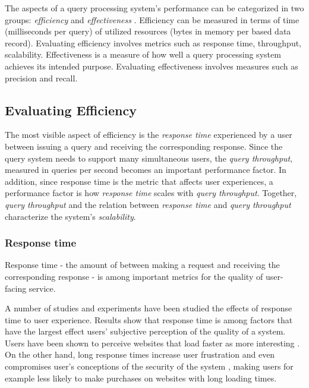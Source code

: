 The aspects of a query processing system's performance can be categorized in two groups:
\textit{efficiency} and \textit{effectiveness} \cite{buttcher:informationretrieval}.
Efficiency can be measured in terms of time (milliseconds per query) of utilized resources (bytes in memory per based
data record).
Evaluating efficiency involves metrics such as response time, throughput, scalability.
Effectiveness is a measure of how well a query processing system achieves its intended purpose.
Evaluating effectiveness involves measures such as precision and recall.

\subsection{Evaluating Efficiency}

The most visible aspect of efficiency is the \textit{response time} experienced by a user between issuing a query and
receiving the corresponding response.
Since the query system needs to support many simultaneous users, the \textit{query throughput}, measured in queries per
second becomes an important performance factor.
In addition, since response time is the metric that affects user experiences, a performance factor is how
\textit{response time} scales with \textit{query throughput}.
Together, \textit{query throughput} and the relation between \textit{response time} and \textit{query throughput}
characterize the system's \textit{scalability}.

\subsubsection{Response time}
Response time - the amount of between making a request and receiving the corresponding response -
is among important metrics for the quality of user-facing service.

A number of studies and experiments have been studied the effects of response time to user experience.
Results show that response time is among factors that have the largest effect users' subjective perception of the
quality of a system.
Users have been shown to perceive websites that load faster as more interesting \cite{ramsay/retrievaltimesinvestigation}.
On the other hand, long response times increase user frustration \cite{ceaparu:userfrustration} and even compromises
user's conceptions of the security of the system \cite{bouch:qualityeyebeholder}, making users for example less likely to
make purchases on websites with long loading times.

